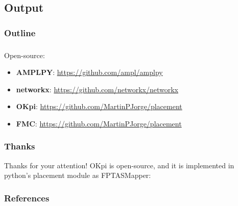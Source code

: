 \documentclass[aspectratio=169]{beamer}
\begin{document}
\subsection{Output}
\begin{frame}
    \frametitle{Outline}
    \tableofcontents[subsectionstyle=show/shaded/hide,sectionstyle=show/shaded]
\end{frame}



\begin{frame}
    \frametitle{\secname}
    \framesubtitle{\subsecname}
    Open-source:
    \begin{itemize}
        \item \textbf{AMPLPY}: \url{https://github.com/ampl/amplpy}
        \item \textbf{networkx}: \url{https://github.com/networkx/networkx}
        \item \textbf{OKpi}: \url{https://github.com/MartinPJorge/placement}
        \item \textbf{FMC}: \url{https://github.com/MartinPJorge/placement}
    \end{itemize}
\end{frame}







\begin{frame}
    \frametitle{Thanks}

    {\centering \huge
        Thanks for your attention!
    }
    \vfill
    OKpi is open-source, and it is implemented in python's placement module as FPTASMapper:
\end{frame}






\begin{frame}[allowframebreaks]
        \frametitle{References}
        \printbibliography[heading=none]
\end{frame}
\end{document}
